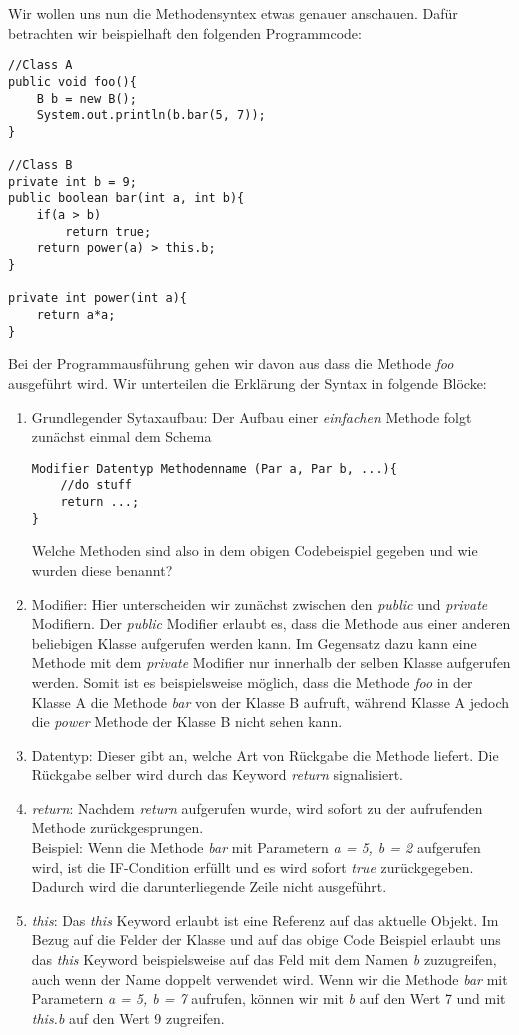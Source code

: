 \begin{Infobox}
    Wir wollen uns nun die Methodensyntex etwas genauer anschauen. Dafür betrachten wir beispielhaft den folgenden Programmcode:
    \begin{lstlisting}[breaklines=true, numbers=none]
//Class A
public void foo(){
    B b = new B();
    System.out.println(b.bar(5, 7));
}

//Class B
private int b = 9;
public boolean bar(int a, int b){
    if(a > b)
        return true;
    return power(a) > this.b;
}

private int power(int a){
    return a*a;
}
\end{lstlisting}
Bei der Programmausführung gehen wir davon aus dass die Methode \textit{foo} ausgeführt wird. Wir unterteilen die Erklärung der Syntax in folgende Blöcke:
\begin{enumerate}[label=\roman*)]
    \item 
    Grundlegender Sytaxaufbau: Der Aufbau einer \textit{einfachen} Methode folgt zunächst einmal dem Schema 
    \begin{lstlisting}
Modifier Datentyp Methodenname (Par a, Par b, ...){
    //do stuff
    return ...;
}
    \end{lstlisting}
    Welche Methoden sind also in dem obigen Codebeispiel gegeben und wie wurden diese benannt?
    \item Modifier: Hier unterscheiden wir zunächst zwischen den \textit{public} und \textit{private} Modifiern. Der \textit{public} Modifier erlaubt es, dass die Methode aus einer
    anderen beliebigen Klasse aufgerufen werden kann. Im Gegensatz dazu kann eine Methode mit dem \textit{private} Modifier nur innerhalb der selben Klasse aufgerufen werden.
    Somit ist es beispielsweise möglich, dass die Methode \textit{foo} in der Klasse A die Methode \textit{bar} von der Klasse B aufruft, während Klasse A jedoch die \textit{power} Methode
    der Klasse B nicht sehen kann.
    \item Datentyp: Dieser gibt an, welche Art von Rückgabe die Methode liefert. Die Rückgabe selber wird durch das Keyword \textit{return} signalisiert.
    \item \textit{return}:
    Nachdem \textit{return} aufgerufen wurde, wird sofort zu der aufrufenden Methode zurückgesprungen.\\
    Beispiel: Wenn die Methode \textit{bar} mit Parametern \textit{a = 5, b = 2} aufgerufen wird, ist die IF-Condition erfüllt und es wird sofort \textit{true} zurückgegeben.
    Dadurch wird die darunterliegende Zeile nicht ausgeführt.
    \item \textit{this}: Das \textit{this} Keyword erlaubt ist eine Referenz auf das aktuelle Objekt. Im Bezug auf die Felder der Klasse und auf das obige Code Beispiel erlaubt uns das 
    \textit{this} Keyword beispielsweise auf das Feld mit dem Namen \textit{b} zuzugreifen, auch wenn der Name doppelt verwendet wird. Wenn wir die Methode \textit{bar} mit Parametern 
    \textit{a = 5, b = 7} aufrufen, können wir mit \textit{b} auf den Wert 7 und mit \textit{this.b} auf den Wert 9 zugreifen.
\end{enumerate}

\end{Infobox}

